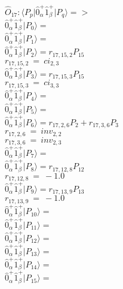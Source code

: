 \documentclass[14pt]{article}
\begin{document}
    $\hat{O}_{17}:  \langle{P_p}\vert \hat{0}_{\alpha}^{+}\hat{1}_{\beta}^{+} \vert{P_q}\rangle => $ \\ 
    $ \hat{0}_{\alpha}^{+}\hat{1}_{\beta}^{+} \vert{P_{0}}\rangle =  $ \\ 
    $ \hat{0}_{\alpha}^{+}\hat{1}_{\beta}^{+} \vert{P_{1}}\rangle =  $ \\ 
    $ \hat{0}_{\alpha}^{+}\hat{1}_{\beta}^{+} \vert{P_{2}}\rangle = {r}_{17,15,2}P_{15} $ \\ 
    ${r}_{17,15,2}\ =\ {ci}_{2,3} $ \\ 
    $ \hat{0}_{\alpha}^{+}\hat{1}_{\beta}^{+} \vert{P_{3}}\rangle = {r}_{17,15,3}P_{15} $ \\ 
    ${r}_{17,15,3}\ =\ {ci}_{3,3} $ \\ 
    $ \hat{0}_{\alpha}^{+}\hat{1}_{\beta}^{+} \vert{P_{4}}\rangle =  $ \\ 
    $ \hat{0}_{\alpha}^{+}\hat{1}_{\beta}^{+} \vert{P_{5}}\rangle =  $ \\ 
    $ \hat{0}_{\alpha}^{+}\hat{1}_{\beta}^{+} \vert{P_{6}}\rangle = {r}_{17,2,6}P_{2}+{r}_{17,3,6}P_{3} $ \\ 
    ${r}_{17,2,6}\ =\ {inv}_{2,2} $ \\ 
    ${r}_{17,3,6}\ =\ {inv}_{2,3} $ \\ 
    $ \hat{0}_{\alpha}^{+}\hat{1}_{\beta}^{+} \vert{P_{7}}\rangle =  $ \\ 
    $ \hat{0}_{\alpha}^{+}\hat{1}_{\beta}^{+} \vert{P_{8}}\rangle = {r}_{17,12,8}P_{12} $ \\ 
    ${r}_{17,12,8}\ =\ -1.0 $ \\ 
    $ \hat{0}_{\alpha}^{+}\hat{1}_{\beta}^{+} \vert{P_{9}}\rangle = {r}_{17,13,9}P_{13} $ \\ 
    ${r}_{17,13,9}\ =\ -1.0 $ \\ 
    $ \hat{0}_{\alpha}^{+}\hat{1}_{\beta}^{+} \vert{P_{10}}\rangle =  $ \\ 
    $ \hat{0}_{\alpha}^{+}\hat{1}_{\beta}^{+} \vert{P_{11}}\rangle =  $ \\ 
    $ \hat{0}_{\alpha}^{+}\hat{1}_{\beta}^{+} \vert{P_{12}}\rangle =  $ \\ 
    $ \hat{0}_{\alpha}^{+}\hat{1}_{\beta}^{+} \vert{P_{13}}\rangle =  $ \\ 
    $ \hat{0}_{\alpha}^{+}\hat{1}_{\beta}^{+} \vert{P_{14}}\rangle =  $ \\ 
    $ \hat{0}_{\alpha}^{+}\hat{1}_{\beta}^{+} \vert{P_{15}}\rangle =  $ \\ 
    
\end{document}

